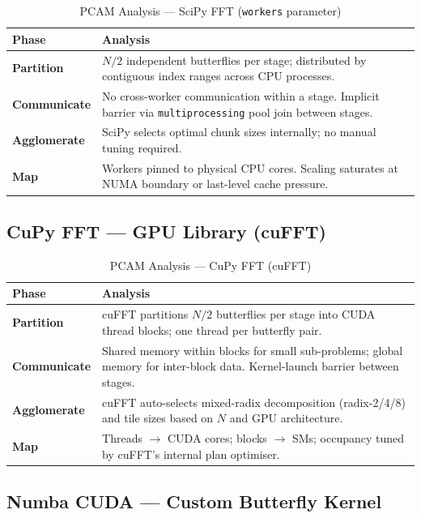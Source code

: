 \documentclass[12pt, letterpaper]{article}
\begin{document}
\begin{table}[H]
\centering
\caption{PCAM Analysis --- SciPy FFT (\texttt{workers} parameter)}
\begin{tabular}{@{}p{3cm}p{10cm}@{}}
\toprule
\textbf{Phase} & \textbf{Analysis} \\
\midrule
\textbf{Partition} & $N/2$ independent butterflies per stage; distributed by contiguous index ranges across CPU processes. \\
\textbf{Communicate} & No cross-worker communication within a stage. Implicit barrier via \texttt{multiprocessing} pool join between stages. \\
\textbf{Agglomerate} & SciPy selects optimal chunk sizes internally; no manual tuning required. \\
\textbf{Map} & Workers pinned to physical CPU cores. Scaling saturates at NUMA boundary or last-level cache pressure. \\
\bottomrule
\end{tabular}
\label{tab:pcam_scipy}
\end{table}

\subsection{CuPy FFT --- GPU Library (cuFFT)}

\begin{table}[H]
\centering
\caption{PCAM Analysis --- CuPy FFT (cuFFT)}
\begin{tabular}{@{}p{3cm}p{10cm}@{}}
\toprule
\textbf{Phase} & \textbf{Analysis} \\
\midrule
\textbf{Partition} & cuFFT partitions $N/2$ butterflies per stage into CUDA thread blocks; one thread per butterfly pair. \\
\textbf{Communicate} & Shared memory within blocks for small sub-problems; global memory for inter-block data. Kernel-launch barrier between stages. \\
\textbf{Agglomerate} & cuFFT auto-selects mixed-radix decomposition (radix-2/4/8) and tile sizes based on $N$ and GPU architecture. \\
\textbf{Map} & Threads $\to$ CUDA cores; blocks $\to$ SMs; occupancy tuned by cuFFT's internal plan optimiser. \\
\bottomrule
\end{tabular}
\label{tab:pcam_cupy}
\end{table}

\subsection{Numba CUDA --- Custom Butterfly Kernel}
\end{document}
